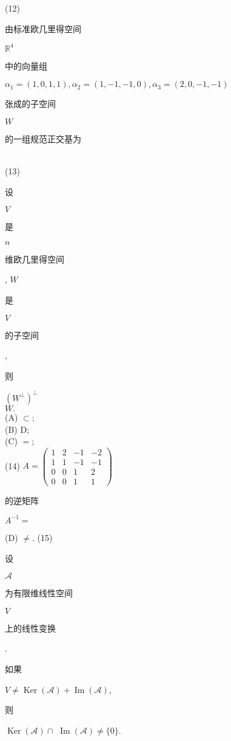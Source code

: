 \documentclass[10pt]{article}
\begin{document}
(12) \begin{CJK}{UTF8}{mj}由标准欧几里得空间\end{CJK} $\mathbb{R}^{4}$ \begin{CJK}{UTF8}{mj}中的向量组\end{CJK} $\alpha_{1}=(1,0,1,1), \alpha_{2}=(1,-1,-1,0), \alpha_{3}=(2,0,-1,-1)$ \begin{CJK}{UTF8}{mj}张成的子空间\end{CJK} $W$ \begin{CJK}{UTF8}{mj}的一组规范正交基为\end{CJK}\\
(13) \begin{CJK}{UTF8}{mj}设\end{CJK} $V$ \begin{CJK}{UTF8}{mj}是\end{CJK} $n$ \begin{CJK}{UTF8}{mj}维欧几里得空间\end{CJK}, $W$ \begin{CJK}{UTF8}{mj}是\end{CJK} $V$ \begin{CJK}{UTF8}{mj}的子空间\end{CJK}, \begin{CJK}{UTF8}{mj}则\end{CJK} $\left(W^{\perp}\right)^{\perp}$\\
$W .$\\
(A) $\subset$;\\
(B) D;\\
(C) $=$;\\
(14) $A=\left(\begin{array}{cccc}1 & 2 & -1 & -2 \\ 1 & 1 & -1 & -1 \\ 0 & 0 & 1 & 2 \\ 0 & 0 & 1 & 1\end{array}\right)$ \begin{CJK}{UTF8}{mj}的逆矩阵\end{CJK} $A^{-1}=$

(D) $\neq$. (15) \begin{CJK}{UTF8}{mj}设\end{CJK} $\mathscr{A}$ \begin{CJK}{UTF8}{mj}为有限维线性空间\end{CJK} $V$ \begin{CJK}{UTF8}{mj}上的线性变换\end{CJK}. \begin{CJK}{UTF8}{mj}如果\end{CJK} $V \neq \operatorname{Ker}(\mathscr{A})+\operatorname{Im}(\mathscr{A})$, \begin{CJK}{UTF8}{mj}则\end{CJK} $\operatorname{Ker}(\mathscr{A}) \cap$ $\operatorname{Im}(\mathscr{A}) \neq\{0\}$.
\end{document}
